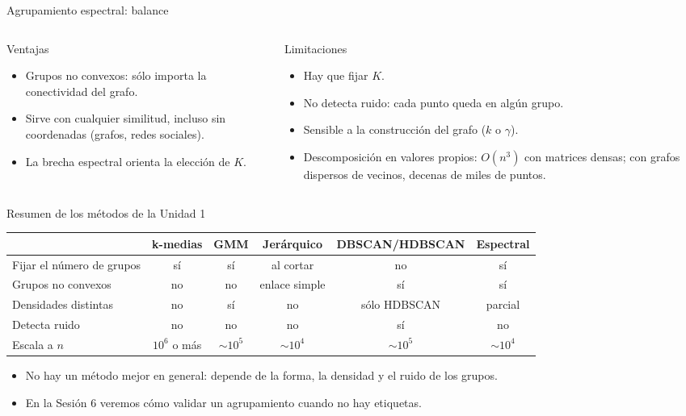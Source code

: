 \documentclass[aspectratio=169,11pt]{beamer}
\begin{document}
\begin{frame}{Agrupamiento espectral: balance}
  \begin{columns}[T]
    \begin{exampleblock}{Ventajas}
      \begin{itemize}
        \item Grupos no convexos: sólo importa la conectividad del grafo.
        \item Sirve con cualquier similitud, incluso sin coordenadas (grafos, redes sociales).
        \item La brecha espectral orienta la elección de $K$.
      \end{itemize}
    \end{exampleblock}
    \begin{alertblock}{Limitaciones}
      \begin{itemize}
        \item Hay que fijar $K$.
        \item No detecta ruido: cada punto queda en algún grupo.
        \item Sensible a la construcción del grafo ($k$ o $\gamma$).
        \item Descomposición en valores propios: $O(n^3)$ con matrices densas;
              con grafos dispersos de vecinos, decenas de miles de puntos.
      \end{itemize}
    \end{alertblock}
  \end{columns}
\end{frame}

\begin{frame}{Resumen de los métodos de la Unidad 1}
  \centering
  \footnotesize
  \renewcommand{\arraystretch}{1.25}
  \begin{tabular}{@{}lccccc@{}}
    \toprule
    & \textbf{k-medias} & \textbf{GMM} & \textbf{Jerárquico} & \textbf{DBSCAN/HDBSCAN} & \textbf{Espectral}\\
    \midrule
    Fijar el número de grupos & sí & sí & al cortar & no & sí \\
    Grupos no convexos & no & no & enlace simple & sí & sí \\
    Densidades distintas & no & sí & no & sólo HDBSCAN & parcial \\
    Detecta ruido & no & no & no & sí & no \\
    Escala a $n$ & $10^6$ o más & $\sim 10^5$ & $\sim 10^4$ & $\sim 10^5$ & $\sim 10^4$ \\
    \bottomrule
  \end{tabular}
  \vspace{8pt}
  \begin{itemize}
    \item No hay un método mejor en general: depende de la forma, la densidad y el ruido de los grupos.
    \item En la Sesión 6 veremos cómo validar un agrupamiento cuando no hay etiquetas.
  \end{itemize}
\end{frame}
\end{document}
